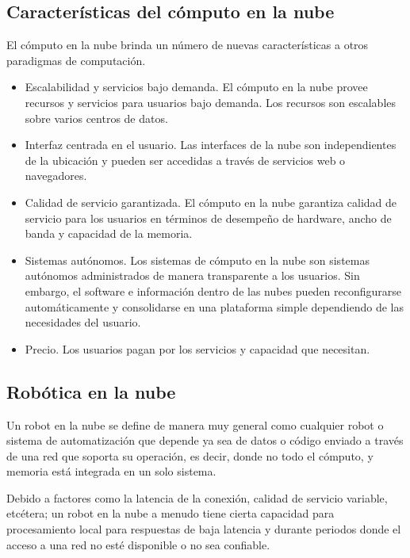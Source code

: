 \subsection{Características del cómputo en la nube}
\label{\detokenize{chapter_one/cloud_computing:caracteristicas-del-computo-en-la-nube}}
El cómputo en la nube brinda un número de nuevas características
a otros paradigmas de computación.
\begin{itemize}
\item {} 
Escalabilidad y servicios bajo demanda. El cómputo en la nube  provee recursos y servicios para usuarios bajo demanda. Los recursos son escalables sobre varios centros de datos.

\item {} 
Interfaz centrada en el usuario. Las interfaces de la nube son independientes de la ubicación y pueden ser accedidas a través de servicios web o navegadores.

\item {} 
Calidad de servicio garantizada. El cómputo en la nube garantiza calidad de servicio para los usuarios en términos de desempeño de hardware, ancho de banda y capacidad de la memoria.

\item {} 
Sistemas autónomos. Los sistemas de cómputo en la nube son sistemas autónomos administrados de manera transparente a los usuarios. Sin embargo, el software e información dentro de las nubes pueden reconfigurarse automáticamente y consolidarse en una plataforma simple dependiendo de las necesidades del usuario.

\item {} 
Precio. Los usuarios pagan por los servicios y capacidad que necesitan.

\end{itemize}


\subsection{Robótica en la nube}
\label{\detokenize{chapter_one/cloud_computing:robotica-en-la-nube}}

\begin{remark}
Un robot en la nube se define de manera muy general como
cualquier robot o sistema de automatización  que depende ya sea de datos o
código enviado a través de una red que soporta su operación, es decir, donde
no todo el cómputo, y memoria está integrada en un solo sistema.\\

\end{remark}
Debido a factores como la latencia de la conexión, calidad de servicio variable, etcétera;
un robot en la nube a menudo tiene cierta capacidad para procesamiento local para
respuestas de baja latencia y durante periodos donde el acceso a una red no esté
disponible o no sea confiable.

